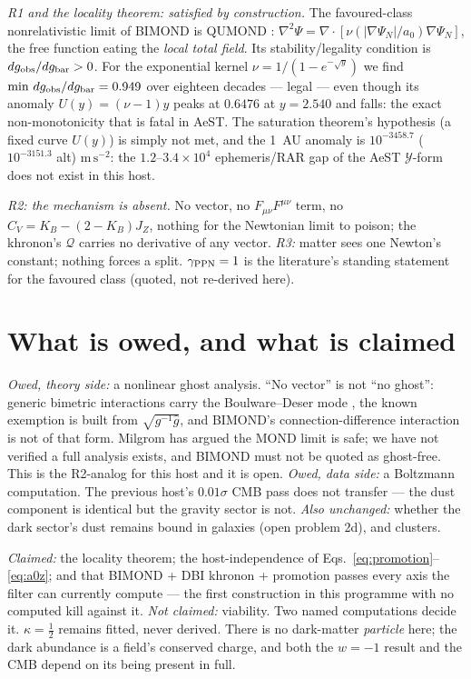 \documentclass[aps,prd,twocolumn,10pt,nofootinbib,superscriptaddress]{revtex4-2}
\newcommand{\QQ}{\mathcal{Q}}
\newcommand{\YY}{\mathcal{Y}}
\begin{document}
\emph{R1 and the locality theorem: satisfied by construction.} The favoured-class
nonrelativistic limit of BIMOND is QUMOND \cite{QUMOND}: $\nabla^2\Psi=\nabla\!\cdot\!
[\nu(|\nabla\Psi_N|/a_0)\nabla\Psi_N]$, the free function eating the \emph{local total field}.
Its stability/legality condition is $dg_{\rm obs}/dg_{\rm bar}>0$. For the exponential kernel
$\nu=1/(1-e^{-\sqrt y})$ we find $\min\,dg_{\rm obs}/dg_{\rm bar}=0.949$ over eighteen decades
--- legal --- even though its anomaly $U(y)=(\nu-1)y$ peaks at $0.6476$ at $y=2.540$ and falls:
the exact non-monotonicity that is fatal in AeST. The saturation theorem's hypothesis (a fixed
curve $U(y)$) is simply not met, and the 1~AU anomaly is
$10^{-3458.7}$ ($10^{-3151.3}$ alt) $\mathrm{m\,s^{-2}}$: the $1.2$--$3.4\times10^{4}$
ephemeris/RAR gap of the AeST $\YY$-form does not exist in this host.

\emph{R2: the mechanism is absent.} No vector, no $F_{\mu\nu}F^{\mu\nu}$ term, no
$C_V=K_B-(2-K_B)J_Z$, nothing for the Newtonian limit to poison; the khronon's $\QQ$ carries no
derivative of any vector. \emph{R3:} matter sees one Newton's constant; nothing forces a split.
$\gamma_{\rm PPN}=1$ is the literature's standing statement for the favoured class (quoted, not
re-derived here).

\section{What is owed, and what is claimed}

\emph{Owed, theory side:} a nonlinear ghost analysis. ``No vector'' is not ``no ghost'': generic
bimetric interactions carry the Boulware--Deser mode \cite{BD}, the known exemption
\cite{HR} is built from $\sqrt{g^{-1}\hat g}$, and BIMOND's connection-difference interaction is
not of that form. Milgrom has argued the MOND limit is safe; we have not verified a full
analysis exists, and BIMOND must not be quoted as ghost-free. This is the R2-analog for this
host and it is open. \emph{Owed, data side:} a Boltzmann computation. The previous host's
$0.01\sigma$ CMB pass does not transfer --- the dust component is identical but the gravity
sector is not. \emph{Also unchanged:} whether the dark sector's dust remains bound in galaxies
(open problem 2d), and clusters.

\emph{Claimed:} the locality theorem; the host-independence of
Eqs.~\eqref{eq:promotion}--\eqref{eq:a0z}; and that BIMOND + DBI khronon + promotion passes
every axis the filter can currently compute --- the first construction in this programme with no
computed kill against it. \emph{Not claimed:} viability. Two named computations decide it.
$\kappa=\tfrac12$ remains fitted, never derived. There is no dark-matter \emph{particle} here;
the dark abundance is a field's conserved charge, and both the $w=-1$ result and the CMB depend
on its being present in full.
\end{document}
